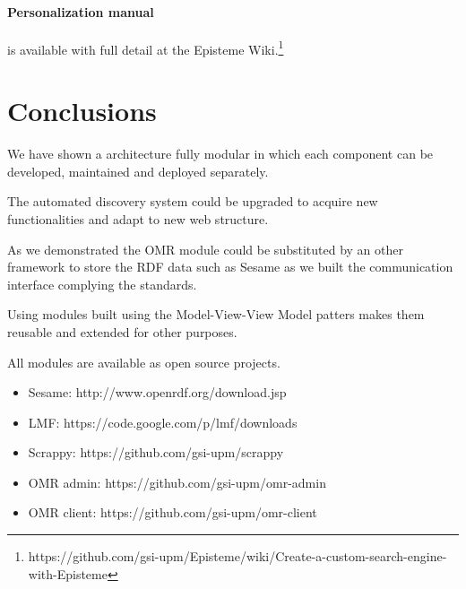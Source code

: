 \paragraph{Personalization manual} is available with full detail at the Episteme Wiki.\footnote{https://github.com/gsi-upm/Episteme/wiki/Create-a-custom-search-engine-with-Episteme}


\section{Conclusions}
We have shown a architecture fully modular in which each component can be developed, maintained and deployed separately.

The automated discovery system could be upgraded to acquire  new functionalities and adapt to new web structure.

As we demonstrated the OMR module could be substituted by an other framework to store the RDF data such as Sesame as we built the communication interface complying the standards.

Using modules built using the Model-View-View Model patters makes them reusable and extended for other purposes.

All modules are available as open source projects.

\begin{itemize}
\item Sesame: http://www.openrdf.org/download.jsp
\item LMF: https://code.google.com/p/lmf/downloads
\item Scrappy: https://github.com/gsi-upm/scrappy
\item OMR admin: https://github.com/gsi-upm/omr-admin
\item OMR client: https://github.com/gsi-upm/omr-client
\end{itemize}
